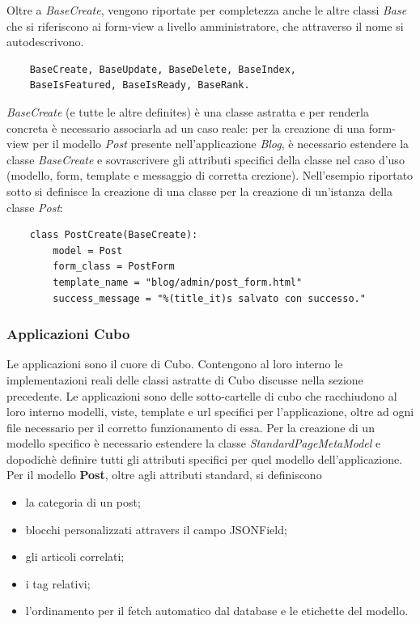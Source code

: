 \documentclass[12pt,a4paper]{article}
\begin{document}
Oltre a \textit{BaseCreate}, vengono riportate per completezza anche le altre classi \textit{Base} che si riferiscono ai form-view a livello amministratore, che attraverso il nome si autodescrivono.

\begin{verbatim}
    BaseCreate, BaseUpdate, BaseDelete, BaseIndex,
    BaseIsFeatured, BaseIsReady, BaseRank.
\end{verbatim}

\textit{BaseCreate} (e tutte le altre definites) è una classe astratta e per renderla concreta è necessario associarla ad un caso reale: per la creazione di una form-view per il modello \textit{Post} presente nell'applicazione \textit{Blog}, è necessario estendere la classe \textit{BaseCreate} e sovrascrivere gli attributi specifici della classe nel caso d'uso (modello, form, template e messaggio di corretta crezione). Nell'esempio riportato sotto si definisce la creazione di una classe per la creazione di un'istanza della classe \textit{Post}:
\begin{verbatim}
    class PostCreate(BaseCreate):
        model = Post
        form_class = PostForm
        template_name = "blog/admin/post_form.html"
        success_message = "%(title_it)s salvato con successo."
\end{verbatim}

\subsubsection{Applicazioni Cubo}
Le applicazioni sono il cuore di Cubo. Contengono al loro interno le implementazioni reali delle classi astratte di Cubo discusse nella sezione precedente. Le applicazioni sono delle sotto-cartelle di cubo che racchiudono al loro interno modelli, viste, template e url specifici per l'applicazione, oltre ad ogni file necessario per il corretto funzionamento di essa. Per la creazione di un modello specifico è necessario estendere la classe \textit{StandardPageMetaModel} e dopodichè definire tutti gli attributi specifici per quel modello dell'applicazione. Per il modello \textbf{Post}, oltre agli attributi standard, si definiscono
\begin{itemize}
    \item la categoria di un post;
    \item blocchi personalizzati attravers il campo JSONField;
    \item gli articoli correlati;
    \item i tag relativi;
    \item l'ordinamento per il fetch automatico dal database e le etichette del modello.
\end{itemize}
\end{document}
